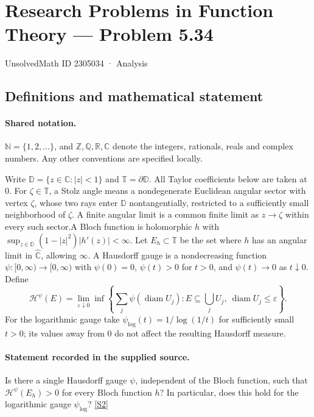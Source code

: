 \documentclass[11pt]{article}
\newcommand{\sref}[2]{\hyperlink{source:#1:#2}{[S#2]}}
\begin{document}
\setcounter{section}{2305033}
\section{Research Problems in Function Theory — Problem 5.34}\label{2305034}
{\small\sffamily UnsolvedMath ID 2305034 · Analysis}
\subsection{Definitions and mathematical statement}

\paragraph{Shared notation.}$\mathbb N=\{1,2,\ldots\}$, and $\mathbb Z,\mathbb Q,\mathbb R,\mathbb C$ denote the integers, rationals, reals and complex numbers. Any other conventions are specified locally.


Write $\mathbb D=\{z\in\mathbb C:|z|<1\}$ and $\mathbb T=\partial\mathbb D$. All Taylor coefficients below are taken at $0$. For $\zeta\in\mathbb T$, a Stolz angle means a nondegenerate Euclidean angular sector with vertex $\zeta$, whose two rays enter $\mathbb D$ nontangentially, restricted to a sufficiently small neighborhood of $\zeta$. A finite angular limit is a common finite limit as $z\to\zeta$ within every such sector.A Bloch function is holomorphic $h$ with $\sup_{z\in\mathbb D}(1-|z|^2)|h'(z)|<\infty$. Let $E_h\subset\mathbb T$ be the set where $h$ has an angular limit in $\widehat{\mathbb C}$, allowing $\infty$. A Hausdorff gauge is a nondecreasing function $\psi:[0,\infty)\to[0,\infty)$ with $\psi(0)=0$, $\psi(t)>0$ for $t>0$, and $\psi(t)\to0$ as $t\downarrow0$. Define
\[\mathcal H^\psi(E)=\lim_{\varepsilon\downarrow0}\inf\left\{\sum_j\psi(\operatorname{diam}U_j):E\subseteq\bigcup_j U_j,\ \operatorname{diam}U_j\le\varepsilon\right\}.
\]
For the logarithmic gauge take $\psi_{\log}(t)=1/\log(1/t)$ for sufficiently small $t>0$; its values away from $0$ do not affect the resulting Hausdorff measure.
\paragraph{Statement recorded in the supplied source.}
Is there a single Hausdorff gauge $\psi$, independent of the Bloch function, such that $\mathcal H^\psi(E_h)>0$ for every Bloch function $h$? In particular, does this hold for the logarithmic gauge $\psi_{\log}$? \sref{2305034}{2}
\end{document}
